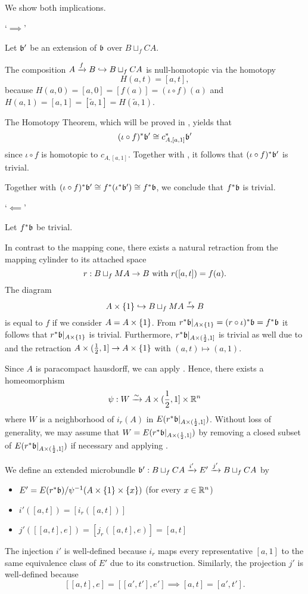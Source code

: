 \begin{myproof} We show both implications.

`$\implies$'

Let $\bb'$ be an extension of $\bb$ over $B \sqcup_f CA$.

The composition $A \xrightarrow{f} B \hookrightarrow{} B \sqcup_f CA$ is null-homotopic via the homotopy \[ H(a, t) = [a, t], \] because $H(a, 0) = [a, 0] = [f(a)] = (\iota \circ f)(a)$ and $H(a, 1) = [a, 1] = [\tilde{a}, 1] = H(\tilde{a}, 1)$.

The Homotopy Theorem, which will be proved in , yields that \[ \ind{(\iota \circ f)}\bb' \cong \ind{c_{A, [a, 1]}}\bb' \] since $\iota \circ f$ is homotopic to $c_{A, [a, 1]}$. Together with , it follows that $\ind{(\iota \circ f)}\bb'$ is trivial.

Together with $\ind{(\iota \circ f)}\bb' \cong \ind{f}(\ind{\iota}\bb') \cong \ind{f}\bb$, we conclude that $\ind{f}\bb$ is trivial.

`$\impliedby$'

Let $\ind{f}\bb$ be trivial.

In contrast to the mapping cone, there exists a natural retraction from the mapping cylinder to its attached space \[ r: B \sqcup_f MA \to B \text{ with } r([a, t]) = f(a). \] The diagram \[ A \times \{1\} \hookrightarrow{} B \sqcup_f MA \xrightarrow{r} B \] is equal to $f$ if we consider $A = A \times{} \{1\}$. From $\ind{r}\bb[A \cross \{1\}] = \ind{(r \circ \iota)}\bb = \ind{f}\bb$ it follows that $\ind{r}\bb[A \cross \{1\}]$ is trivial. Furthermore, $\ind{r}\bb[A \cross {(\half, 1]}]$ is trivial as well due to  and the retraction $A \times (\frac{1}{2}, 1] \to A \times{} \{1\}$ with $(a, t) \mapsto (a, 1)$.

Since $A$ is paracompact hausdorff, we can apply . Hence, there exists a homeomorphism \[ \psi: W \xrightarrow{\sim} A \times (\frac{1}{2}, 1] \times \mathbb{R}^n \] where $W$ is a neighborhood of $i_r(A)$ in $E(\ind{r}\bb[A \cross {(\half, 1]}])$. Without loss of generality, we may assume that $W = E(\ind{r}\bb[A \cross {(\half, 1]}])$ by removing a closed subset of $E(\ind{r}\bb[A \cross {(\half, 1]}])$ if necessary and applying .

We define an extended microbundle $\bundledef{\bb'}{B \sqcup_f CA}{E'}{i'}{j'}$ by \begin{itemize} \item $E' = E(\ind{r}\bb) / \inv{\psi}(A \cross \{1\} \cross \{x\})$ (for every $x \in \mathbb{R}^n$) \item $i'([a, t]) = [i_r([a, t])]$ \item $j'([[a, t], e]) = [j_r([a, t], e)] = [a, t]$ \end{itemize} The injection $i'$ is well-defined because $i_r$ maps every representative $[a, 1]$ to the same equivalence class of $E'$ due to its construction. Similarly, the projection $j'$ is well-defined because \[ [[a, t], e] = [[a', t'], e'] \implies [a, t] = [a', t']. \]


\end{myproof}
